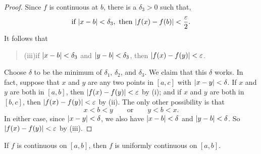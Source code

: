 \begin{proof}
Since $f$ is continuous at $b$, there is a $\delta_3 > 0$ such that,
\[
\text{if }\lvert x - b\rvert < \delta_3,\text{ then }
\lvert f(x) - f(b)\rvert < \frac{\varepsilon}{2}.
\]
It follows that
\begin{quote}
(iii)\quad if $\lvert x - b\rvert < \delta_3$ and $\lvert y - b\rvert < \delta_3$, then
$\lvert f(x) - f(y)\rvert < \varepsilon$.
\end{quote}
Choose $\delta$ to be the minimum of $\delta_1$, $\delta_2$, and $\delta_3$.
We claim that this $\delta$ works. In fact, suppose that $x$ and $y$ are any
two points in $[a,c]$ with $\lvert x - y\rvert < \delta$. If $x$ and $y$ are both in
$[a,b]$, then $\lvert f(x) - f(y)\rvert < \varepsilon$ by (i); and if $x$ and $y$
are both in $[b,c]$, then $\lvert f(x) - f(y)\rvert < \varepsilon$ by (ii). The only
other possibility is that
\[
x < b < y \qquad\text{or}\qquad y < b < x.
\]
In either case, since $\lvert x - y\rvert < \delta$, we also have
$\lvert x - b\rvert < \delta$ and $\lvert y - b\rvert < \delta$. So
$\lvert f(x) - f(y)\rvert < \varepsilon$ by (iii).
\end{proof}

\setcounter{theorem}{0}
\begin{theorem}
If $f$ is continuous on $[a,b]$, then $f$ is uniformly continuous on
$[a,b]$.
\end{theorem}

